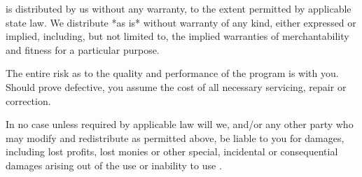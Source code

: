 {\GAP} is distributed by us without any warranty, to the extent permitted
by applicable state law.  We  distribute {\GAP} *as is* without  warranty
of any kind, either expressed or implied, including,  but not limited to,
the implied  warranties  of merchantability and  fitness for a particular
purpose.

The entire risk as to the quality and performance of the program is  with
you.  Should {\GAP} prove defective, you assume the cost of all necessary
servicing, repair or correction.

In no  case  unless  required by applicable law will we, and/or any other
party who  may  modify  and  redistribute  {\GAP}  as permitted above, be
liable  to you for damages, including lost profits, lost monies or  other
special, incidental or consequential damages  arising out  of the  use or
inability to use {\GAP}.
